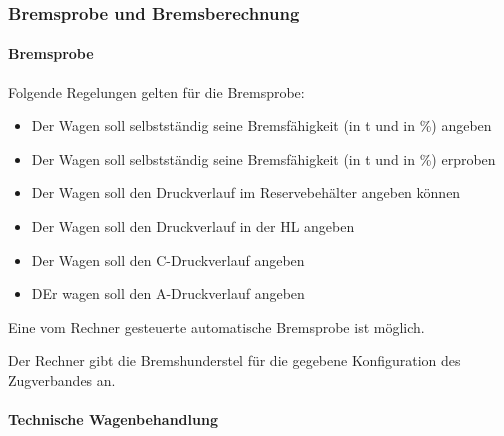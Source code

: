 \subsubsection{Bremsprobe und Bremsberechnung}
\paragraph{Bremsprobe}
\begin{feat}
Folgende Regelungen gelten für die Bremsprobe:
\begin{itemize}
    \item Der Wagen soll selbstständig seine Bremsfähigkeit (in t und in \%) angeben
    \item Der Wagen soll selbstständig seine Bremsfähigkeit (in t und in \%) erproben
    \item Der Wagen soll den Druckverlauf im Reservebehälter angeben können
    \item Der Wagen soll den Druckverlauf in der \acrshort{HL} angeben
    \item Der Wagen soll den C-Druckverlauf angeben
    \item DEr wagen soll den A-Druckverlauf angeben
\end{itemize}
\end{feat}
\begin{feat}
Eine vom Rechner gesteuerte automatische Bremsprobe ist möglich.
\end{feat}
\begin{rem} [zu Anf. 50] 
Der Rechner gibt die Bremshunderstel für die gegebene Konfiguration des \gls{Zugverband}es an.
\begin{comment}
Diese hat sich für folgende Fahrten zu unterscheiden:
\begin{itemize}
    \item für Bedienfahrt
    \item für Rangierfahrt
    \item für Sperrfahrt
    \item für Zugfahrt
\end{itemize}
\end{comment}
\end{rem}

\paragraph{Technische Wagenbehandlung}
\begin{comment}
\begin{feat}
So weit eine technische Wagenbehandlung aktor- und sensorgeführt möglich ist, soll diese integriert werden.
\end{feat}
\begin{feat}
Folgende Regelungen gelten für die technische Wagenbehandlung:
\begin{itemize}
    \item Hier muss was hin
\end{itemize}
\end{feat}
\end{comment}

